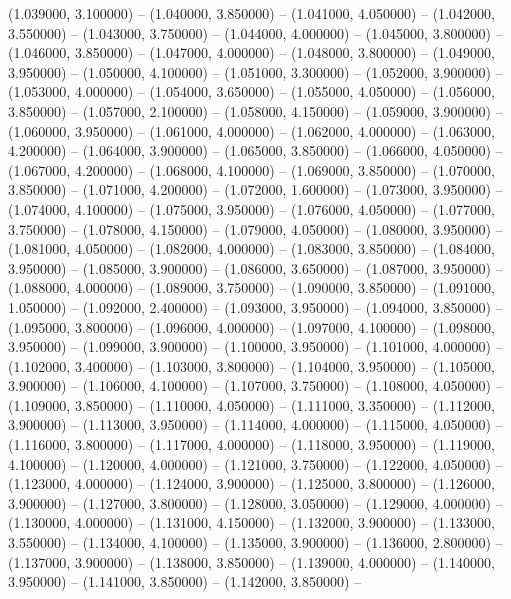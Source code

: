 (1.039000, 3.100000) -- 
(1.040000, 3.850000) -- 
(1.041000, 4.050000) -- 
(1.042000, 3.550000) -- 
(1.043000, 3.750000) -- 
(1.044000, 4.000000) -- 
(1.045000, 3.800000) -- 
(1.046000, 3.850000) -- 
(1.047000, 4.000000) -- 
(1.048000, 3.800000) -- 
(1.049000, 3.950000) -- 
(1.050000, 4.100000) -- 
(1.051000, 3.300000) -- 
(1.052000, 3.900000) -- 
(1.053000, 4.000000) -- 
(1.054000, 3.650000) -- 
(1.055000, 4.050000) -- 
(1.056000, 3.850000) -- 
(1.057000, 2.100000) -- 
(1.058000, 4.150000) -- 
(1.059000, 3.900000) -- 
(1.060000, 3.950000) -- 
(1.061000, 4.000000) -- 
(1.062000, 4.000000) -- 
(1.063000, 4.200000) -- 
(1.064000, 3.900000) -- 
(1.065000, 3.850000) -- 
(1.066000, 4.050000) -- 
(1.067000, 4.200000) -- 
(1.068000, 4.100000) -- 
(1.069000, 3.850000) -- 
(1.070000, 3.850000) -- 
(1.071000, 4.200000) -- 
(1.072000, 1.600000) -- 
(1.073000, 3.950000) -- 
(1.074000, 4.100000) -- 
(1.075000, 3.950000) -- 
(1.076000, 4.050000) -- 
(1.077000, 3.750000) -- 
(1.078000, 4.150000) -- 
(1.079000, 4.050000) -- 
(1.080000, 3.950000) -- 
(1.081000, 4.050000) -- 
(1.082000, 4.000000) -- 
(1.083000, 3.850000) -- 
(1.084000, 3.950000) -- 
(1.085000, 3.900000) -- 
(1.086000, 3.650000) -- 
(1.087000, 3.950000) -- 
(1.088000, 4.000000) -- 
(1.089000, 3.750000) -- 
(1.090000, 3.850000) -- 
(1.091000, 1.050000) -- 
(1.092000, 2.400000) -- 
(1.093000, 3.950000) -- 
(1.094000, 3.850000) -- 
(1.095000, 3.800000) -- 
(1.096000, 4.000000) -- 
(1.097000, 4.100000) -- 
(1.098000, 3.950000) -- 
(1.099000, 3.900000) -- 
(1.100000, 3.950000) -- 
(1.101000, 4.000000) -- 
(1.102000, 3.400000) -- 
(1.103000, 3.800000) -- 
(1.104000, 3.950000) -- 
(1.105000, 3.900000) -- 
(1.106000, 4.100000) -- 
(1.107000, 3.750000) -- 
(1.108000, 4.050000) -- 
(1.109000, 3.850000) -- 
(1.110000, 4.050000) -- 
(1.111000, 3.350000) -- 
(1.112000, 3.900000) -- 
(1.113000, 3.950000) -- 
(1.114000, 4.000000) -- 
(1.115000, 4.050000) -- 
(1.116000, 3.800000) -- 
(1.117000, 4.000000) -- 
(1.118000, 3.950000) -- 
(1.119000, 4.100000) -- 
(1.120000, 4.000000) -- 
(1.121000, 3.750000) -- 
(1.122000, 4.050000) -- 
(1.123000, 4.000000) -- 
(1.124000, 3.900000) -- 
(1.125000, 3.800000) -- 
(1.126000, 3.900000) -- 
(1.127000, 3.800000) -- 
(1.128000, 3.050000) -- 
(1.129000, 4.000000) -- 
(1.130000, 4.000000) -- 
(1.131000, 4.150000) -- 
(1.132000, 3.900000) -- 
(1.133000, 3.550000) -- 
(1.134000, 4.100000) -- 
(1.135000, 3.900000) -- 
(1.136000, 2.800000) -- 
(1.137000, 3.900000) -- 
(1.138000, 3.850000) -- 
(1.139000, 4.000000) -- 
(1.140000, 3.950000) -- 
(1.141000, 3.850000) -- 
(1.142000, 3.850000) -- 
